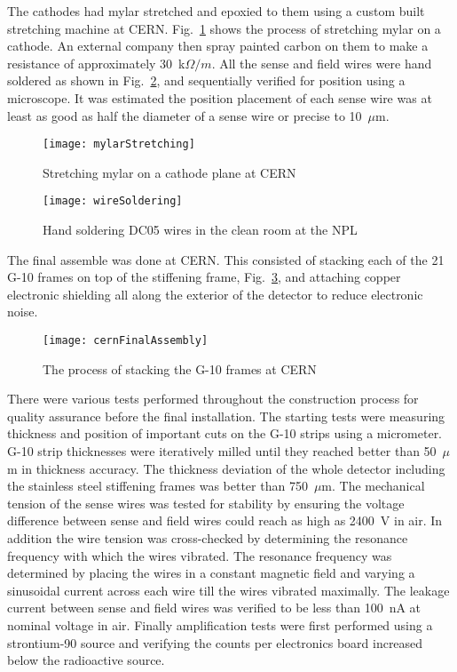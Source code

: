 The cathodes had mylar stretched and epoxied to them using a custom built
stretching machine at CERN.  Fig.~\ref{fig::mylarStretching} shows the process
of stretching mylar on a cathode.  An external company then spray painted carbon
on them to make a resistance of approximately 30~k$\Omega /m$.  All the sense
and field wires were hand soldered as shown in Fig.~\ref{fig::wireSoldering},
and sequentially verified for position using a microscope.  It was estimated the
position placement of each sense wire was at least as good as half the diameter
of a sense wire or precise to 10~$\mu$m.  

\begin{figure}[h!t]
  \centering \texttt{[image: mylarStretching]}
  \caption{Stretching mylar on a cathode plane at CERN}
  \label{fig::mylarStretching}
\end{figure}

\begin{figure}[h!t]
  \centering \texttt{[image: wireSoldering]}
  \caption{Hand soldering DC05 wires in the clean room at the NPL}
  \label{fig::wireSoldering}
\end{figure}

The final assemble was done at CERN.  This consisted of stacking each of the 21
G-10 frames on top of the stiffening frame, Fig.~\ref{fig::cernFinalAssembly},
and attaching copper electronic shielding all along the exterior of the detector
to reduce electronic noise.

\begin{figure}[h!t]
  \centering \texttt{[image: cernFinalAssembly]}
  \caption{The process of stacking the G-10 frames at CERN}
  \label{fig::cernFinalAssembly}
\end{figure}


There were various tests performed throughout the construction process for
quality assurance before the final installation.  The starting tests were
measuring thickness and position of important cuts on the G-10 strips using a
micrometer.  G-10 strip thicknesses were iteratively milled until they reached
better than 50~$\mu$m in thickness accuracy.  The thickness deviation of the
whole detector including the stainless steel stiffening frames was better than
750~$\mu$m.  The mechanical tension of the sense wires was tested for stability
by ensuring the voltage difference between sense and field wires could reach as
high as 2400~V in air.  In addition the wire tension was cross-checked by
determining the resonance frequency with which the wires vibrated.  The
resonance frequency was determined by placing the wires in a constant magnetic
field and varying a sinusoidal current across each wire till the wires vibrated
maximally.  The leakage current between sense and field wires was verified to be
less than 100~nA at nominal voltage in air.  Finally amplification tests were
first performed using a strontium-90 source and verifying the counts per
electronics board increased below the radioactive source.

